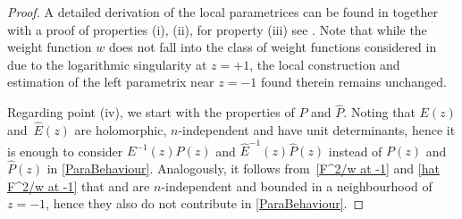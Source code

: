 \documentclass[10pt,a4paper]{amsart}
\newcommand{\bP}{P}
\newcommand{\hP}{{\widehat P}}
\newcommand{\hF}{\widehat F}
\numberwithin{equation}{section}
\begin{document}
\begin{proof}
A detailed derivation of the local parametrices can be found in \cite[Section~6]{KMVV} together with a proof of properties (i), (ii), for property (iii) see \cite[Section~7]{KMVV}. Note that while the weight function $w$ does not fall into the class of weight functions considered in \cite{KMVV} due to the logarithmic singularity at $z = +1$, the local construction and estimation of the left parametrix near $z = -1$ found therein remains unchanged.

Regarding point (iv), we start with the properties of $\bP$ and $\hP$. Noting that $E(z)$ and~$\widehat E(z)$ are holomorphic, $n$-independent and have unit determinants, hence it is enough to consider $E^{-1}(z)\bP(z)$ and $\widehat E^{-1}(z)\hP(z)$ instead of $\bP(z)$ and $\hP(z)$ in \eqref{ParaBehaviour}. Analogously, it follows from~\eqref{F^2/w at -1} and \eqref{hat F^2/w at -1} that  and \smash{$\big(\frac{\hF}{\widehat W}\big)^{\sigma_3}$} are $n$-independent and bounded in a neighbourhood of $z = -1$, hence they also do not contribute in \eqref{ParaBehaviour}.


\end{proof}
\end{document}
